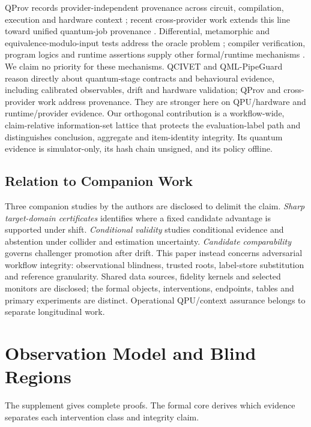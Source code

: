 \documentclass[10pt,journal,compsoc]{IEEEtran}
\begin{document}
QProv records provider-independent provenance across circuit, compilation,
execution and hardware context \cite{Weder2021}; recent cross-provider work
extends this line toward unified quantum-job provenance \cite{Peltonen2026}.
Differential, metamorphic and equivalence-modulo-input tests address the oracle
problem \cite{Wang2021,Paltenghi2023,Luo2026}; compiler verification, program
logics and runtime assertions supply other formal/runtime mechanisms
\cite{Shi2019,Ying2011,Zhou2019,Li2020,Yamaguchi2023}. We claim no priority for
these mechanisms. QCIVET and QML-PipeGuard reason directly about quantum-stage
contracts and behavioural evidence, including calibrated observables, drift
and hardware validation; QProv and cross-provider work address provenance.
They are stronger here on QPU/hardware and runtime/provider evidence. Our
orthogonal contribution is a workflow-wide, claim-relative information-set
lattice that protects the evaluation-label path and distinguishes conclusion,
aggregate and item-identity integrity. Its quantum evidence is simulator-only,
its hash chain unsigned, and its policy offline.

\subsection{Relation to Companion Work}

Three companion studies by the authors are disclosed to delimit the claim.
\emph{Sharp target-domain certificates} \cite{FernandezBarrios2026Certificates}
identifies where a fixed candidate advantage is supported under shift.
\emph{Conditional validity} \cite{FernandezBarrios2026Conditional} studies
conditional evidence and abstention under collider and estimation uncertainty.
\emph{Candidate comparability} \cite{FernandezBarrios2026VBC} governs
challenger promotion after drift. This paper instead concerns adversarial
workflow integrity: observational blindness, trusted roots, label-store
substitution and reference granularity. Shared data sources, fidelity kernels
and selected monitors are disclosed; the formal objects, interventions,
endpoints, tables and primary experiments are distinct. Operational QPU/context
assurance belongs to separate longitudinal work.

\section{Observation Model and Blind Regions}

The supplement gives complete proofs. The formal core derives which evidence
separates each intervention class and integrity claim.
\end{document}
